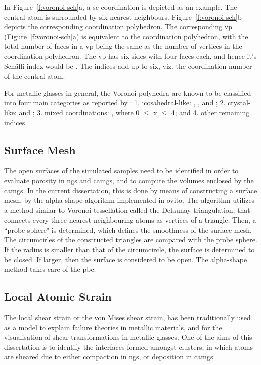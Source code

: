 In Figure~\ref{f:voronoi-sch}a, a \gls{sc} coordination is depicted as an example. The central atom is surrounded by six nearest neighbours. Figure~\ref{f:voronoi-sch}b depicts the corresponding coordination polyhedron. The corresponding \gls{vp} (Figure~\ref{f:voronoi-sch}a) is equivalent to the coordination polyhedron, with the total number of faces in a \gls{vp} being the same as the number of vertices in the coordination polyhedron. The \gls{vp} has six sides with four faces each, and hence it's Sch\"afli index would be . The indices add up to six, viz. the coordination number of the central atom. \par

For metallic glasses in general, the Voronoi polyhedra are known to be classified into four main categories as reported by \textcite{Yue2018}: 1. icosahedral-like: , , and ; 2. crystal-like:  and ; 3. mixed coordinations: , where 0 $\leq$ x $\leq$ 4; and 4. other remaining indices. \par

\subsection{Surface Mesh} \label{s:surmesh}
The open surfaces of the simulated samples need to be identified in order to evaluate porosity in \gls{ng}s and \gls{camg}s, and to compute the volumes enclosed by the \gls{camg}s. In the current dissertation, this is done by means of constructing a surface mesh, by the alpha-shape algorithm \cite{Stukowski2014} implemented in \gls{ovito}. The algorithm utilizes a method similar to Voronoi tessellation called the Delaunay triangulation, that connects every three nearest neighbouring atoms as vertices of a triangle. Then, a ``probe sphere" is determined, which defines the smoothness of the surface mesh. The circumcirles of the constructed triangles are compared with the probe sphere. If the radius is smaller than that of the circumcircle, the surface is determined to be closed. If larger, then the surface is considered to be open. The alpha-shape method takes care of the \gls{pbc}.

\subsection{Local Atomic Strain} \label{s:vonMises}
The local shear strain or the von Mises shear strain, has been traditionally used as a model to explain failure theories in metallic materials, and for the visualisation of shear transformations in metallic glasses. One of the aims of this dissertation is to identify the interfaces formed amongst clusters, in which atoms are sheared due to either compaction in \gls{ng}s, or deposition in \gls{camg}s.  \par

